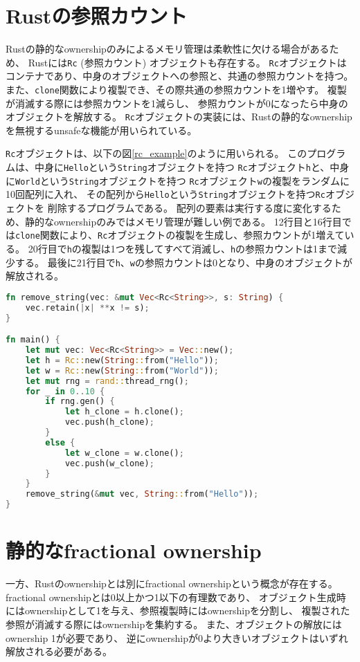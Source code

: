\documentclass{sumiilab-paper}
\theoremstyle{mystyle}
\numberwithin{definition}{chapter} %
\begin{document}
\section{Rustの参照カウント}
Rustの静的なownershipのみによるメモリ管理は柔軟性に欠ける場合があるため、
Rustには\texttt{Rc} (参照カウント) オブジェクトも存在する。
\texttt{Rc}オブジェクトはコンテナであり、中身のオブジェクトへの参照と、共通の参照カウントを持つ。
また、\texttt{clone}関数により複製でき、その際共通の参照カウントを1増やす。
複製が消滅する際には参照カウントを1減らし、
参照カウントが0になったら中身のオブジェクトを解放する。
\texttt{Rc}オブジェクトの実装には、Rustの静的なownershipを無視するunsafeな機能が用いられている。

\texttt{Rc}オブジェクトは、以下の図\ref{rc_example}のように用いられる。
このプログラムは、中身に\texttt{Hello}という\texttt{String}オブジェクトを持つ
\texttt{Rc}オブジェクト\texttt{h}と、中身に\texttt{World}という\texttt{String}オブジェクトを持つ
\texttt{Rc}オブジェクト\texttt{w}の複製をランダムに10回配列に入れ、
その配列から\texttt{Hello}という\texttt{String}オブジェクトを持つ\texttt{Rc}オブジェクトを
削除するプログラムである。
配列の要素は実行する度に変化するため、静的なownershipのみではメモリ管理が難しい例である。
12行目と16行目では\texttt{clone}関数により、\texttt{Rc}オブジェクトの複製を生成し、参照カウントが1増えている。
20行目で\texttt{h}の複製は1つを残してすべて消滅し、\texttt{h}の参照カウントは1まで減少する。
最後に21行目で\texttt{h}、\texttt{w}の参照カウントは0となり、中身のオブジェクトが解放される。
\begin{lstlisting}[language=Rust, caption=Rcオブジェクトの利用例, label=rc_example, captionpos=b]
fn remove_string(vec: &mut Vec<Rc<String>>, s: String) {
    vec.retain(|x| **x != s);
}

fn main() {
    let mut vec: Vec<Rc<String>> = Vec::new();
    let h = Rc::new(String::from("Hello"));
    let w = Rc::new(String::from("World"));
    let mut rng = rand::thread_rng();
    for _ in 0..10 {
        if rng.gen() {
            let h_clone = h.clone();
            vec.push(h_clone);
        }
        else {
            let w_clone = w.clone();
            vec.push(w_clone);
        }
    }
    remove_string(&mut vec, String::from("Hello"));
}
\end{lstlisting}

\section{静的なfractional ownership}
一方、Rustのownershipとは別にfractional ownershipという概念が存在する。
fractional ownershipとは0以上かつ1以下の有理数であり、
オブジェクト生成時にはownershipとして1を与え、参照複製時にはownershipを分割し、
複製された参照が消滅する際にはownershipを集約する。
また、オブジェクトの解放にはownership 1が必要であり、
逆にownershipが0より大きいオブジェクトはいずれ解放される必要がある。
\end{document}
